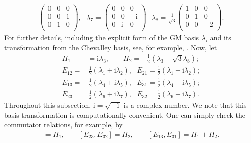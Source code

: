 \documentclass[11pt]{amsart}
\theoremstyle{definition}
\theoremstyle{plain}
\theoremstyle{conclusion}
\begin{document}
\begin{align*}
\begin{pmatrix}
         0 & 0 & 0\\
       0 & 0 & 1 \\
      0 & 1 & 0  \\
     \end{pmatrix},\text{ } \lambda_7 =     \begin{pmatrix}
        0 & 0 & 0\\
        0 & 0 & -\mathrm{i} \\
      0 & \mathrm{i} & 0  \\
     \end{pmatrix}\text{ } \lambda_8 =    \frac{1}{\sqrt{3}} \begin{pmatrix}
         1 & 0 & 0\\
        0 & 1 & 0 \\
      0 & 0 & -2 \\
     \end{pmatrix} .
 \end{align*} For further details, including the explicit form of the GM basis $\lambda_i$ and its transformation from the Chevalley basis, see, for example, \cite[Chapter II]{Cahn1984}. Now, let \begin{align}
 \nonumber
   H_1 &= \mathrm{i} \lambda_3,  \qquad   H_2 = - \frac{\mathrm{i}}{2}\left( \lambda_3 -  \sqrt{3}   \lambda_8 \right);\\
   \nonumber
    E_{12} = &\, \frac{1}{2}(\lambda_1 +  \mathrm{i}\lambda_2), \text{ } E_{21} = \frac{1}{2}(\lambda_1 - \mathrm{i}\lambda_2); \\
    E_{13} = &\, \frac{1}{2}(\lambda_4 +  \mathrm{i}\lambda_5), \text{ } E_{31} = \frac{1}{2}(\lambda_4 - \mathrm{i}\lambda_5); \label{eq:GMbas} \\
    \nonumber
    E_{23} = &\, \frac{1}{2}(\lambda_6 +  \mathrm{i}\lambda_7), \text{ } E_{32} = \frac{1}{2}(\lambda_6 - \mathrm{i}\lambda_7). 
\end{align}  %
Throughout this subsection, $\mathrm{i} =\sqrt{-1}$ is a complex number.  We note that this basis transformation is computationally convenient. One can simply check the commutator relations, for example, by \begin{align*}
    [E_{12},E_{21}]  = H_1,  \qquad  [E_{23},E_{32}] = H_2,  \qquad  [E_{13},E_{31}] = H_1 + H_2.
\end{align*}  %
\end{document}
